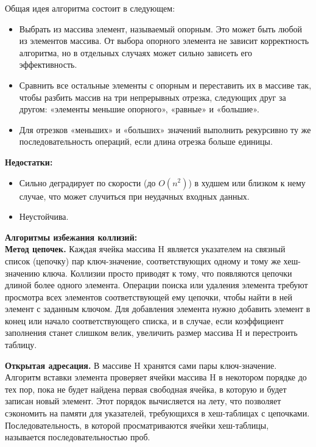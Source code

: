 \documentclass[12pt, a4paper]{article}
\begin{document}
Общая идея алгоритма состоит в следующем:

\begin{itemize}
    \item Выбрать из массива элемент, называемый опорным. Это может быть любой из элементов массива. От выбора опорного элемента не зависит корректность алгоритма, но в отдельных случаях может сильно зависеть его эффективность.
    \item Сравнить все остальные элементы с опорным и переставить их в массиве так, чтобы разбить массив на три непрерывных отрезка, следующих друг за другом: «элементы меньшие опорного», «равные» и «большие». 
    \item Для отрезков «меньших» и «больших» значений выполнить рекурсивно ту же последовательность операций, если длина отрезка больше единицы.
\end{itemize}

\textbf{Недостатки: }

\begin{itemize}
    \item Сильно деградирует по скорости (до ${\displaystyle O(n^{2})}$) в худшем или близком к нему случае, что может случиться при неудачных входных данных.
    \item Неустойчива.
\end{itemize}

\textbf{Алгоритмы избежания коллизий: }\\

\textbf{Метод цепочек.} Каждая ячейка массива H является указателем на связный список (цепочку) пар ключ-значение, соответствующих одному и тому же хеш-значению ключа. Коллизии просто приводят к тому, что появляются цепочки длиной более одного элемента.
Операции поиска или удаления элемента требуют просмотра всех элементов соответствующей ему цепочки, чтобы найти в ней элемент с заданным ключом. Для добавления элемента нужно добавить элемент в конец или начало соответствующего списка, и в случае, если коэффициент заполнения станет слишком велик, увеличить размер массива H и перестроить таблицу.

\textbf{Открытая адресация.} В массиве H хранятся сами пары ключ-значение. Алгоритм вставки элемента проверяет ячейки массива H в некотором порядке до тех пор, пока не будет найдена первая свободная ячейка, в которую и будет записан новый элемент. Этот порядок вычисляется на лету, что позволяет сэкономить на памяти для указателей, требующихся в хеш-таблицах с цепочками. Последовательность, в которой просматриваются ячейки хеш-таблицы, называется последовательностью проб.
\end{document}

